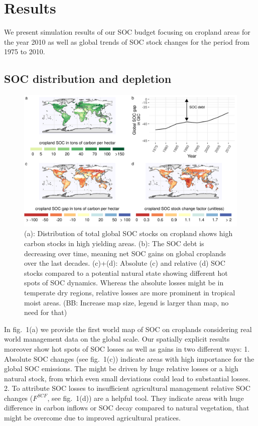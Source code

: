 \documentclass[gc, manuscript]{copernicus}
\begin{document}
\section{Results}

We present simulation results of our SOC budget focusing on cropland
areas for the year 2010 as well as global trends of SOC stock changes
for the period from 1975 to 2010.

\subsection{SOC distribution and depletion}

\begin{figure}[H]
\includegraphics[width=18cm]{../ResultNotebooks/Output/Images/4panelfigure} \caption{(a): Distribution of total global SOC stocks on cropland shows high carbon stocks in high yielding areas. (b): The SOC debt is decreasing over time, meaning net SOC gains on global croplands over the last decades. (c)+(d): Absolute (c) and relative (d) SOC stocks compared to a potential natural state showing different hot spots of SOC dynamics. Whereas the absolute losses might be in temperate dry regions, relative losses are more prominent in tropical moist areas. (BB: Increase map size, legend is larger than map, no need for that)}\label{fig:SOCmaps}
\end{figure}

In fig.~1(a) we provide the first world map of SOC on croplands
considering real world management data on the global scale. Our
spatially explicit results moreover show hot spots of SOC losses as well
as gains in two different ways: 1. Absolute SOC changes (see fig.~1(c))
indicate areas with high importance for the global SOC emissions. The
might be driven by huge relative losses or a high natural stock, from
which even small deviations could lead to substantial losses. 2. To
attribute SOC losses to insufficient agricultural management relative
SOC changes (\(F^{SCF}\), see fig.~1(d)) are a helpful tool. They
indicate areas with huge difference in carbon inflows or SOC decay
compared to natural vegetation, that might be overcome due to improved
agricultural pratices.
\end{document}
